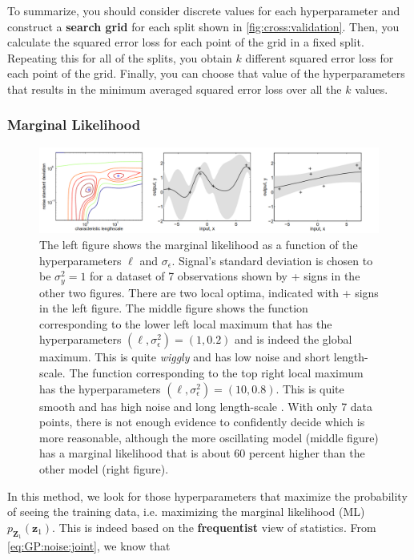 \documentclass[10pt]{article}
\theoremstyle{definition}
\begin{document}
To summarize, you should consider discrete values for each hyperparameter and construct a \textbf{search grid} for each split shown in \cref{fig:cross:validation}. Then, you calculate the squared error loss for each point of the grid in a fixed split. Repeating this for all of the splits, you obtain $k$ different squared error loss for each point of the grid. Finally, you can choose that value of the hyperparameters that results in the minimum averaged squared error loss over all the $k$ values.

\subsubsection{Marginal Likelihood}
\begin{figure}[t!]
\centering
\includegraphics[width=17cm]{figs/marginal-likelihood.png}
\caption{The left figure shows the marginal likelihood as a function of the hyperparameters $\ell$ and $\sigma_{\epsilon}$. Signal's standard
deviation is chosen to be $\sigma_y^2 = 1$ for a dataset of 7 observations shown by + signs in the other two figures. There are two local optima, indicated with + signs in the left figure. The middle figure shows the function corresponding to the lower left local maximum that has the hyperparameters $(\ell, \sigma_{\epsilon}^2)=(1, 0.2)$ and is indeed the global maximum. This is quite \textit{wiggly} and has low noise and short length-scale. The function corresponding to the top right local maximum has the hyperparameters $(\ell, \sigma_{\epsilon}^2)=(10, 0.8)$. This is quite smooth and has high noise and long length-scale \cite[Section 5.4.1]{Rasmussen2006}. With only 7 data points, there is not enough evidence to confidently decide which is more reasonable, although the more oscillating model (middle figure) has a marginal likelihood that is about 60 percent higher than the other model (right figure)\cite[Section 15.2.4]{Murphy2012}.}
\label{fig:marginal:likelihood}
\end{figure}
In this method, we look for those hyperparameters that maximize the probability of seeing the training data, i.e. maximizing the marginal likelihood (ML) $p_{\mathbf{Z}_1}(\mathbf{z}_1)$. This is indeed based on the \textbf{frequentist} view of statistics. From \eqref{eq:GP:noise:joint}, we know that
\end{document}
